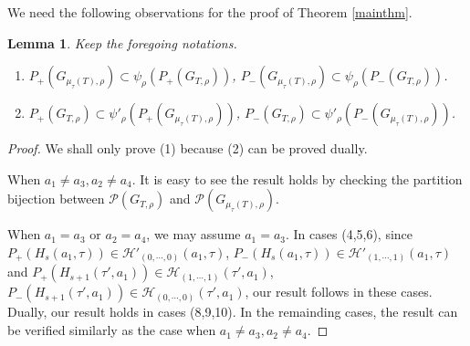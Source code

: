 \documentclass[10pt]{amsart}
\theoremstyle{theorems}
\newtheorem{Lemma}[Theorem]{Lemma}
\begin{document}
\medskip

We need the following observations for the proof of Theorem \ref{mainthm}.

\medskip

\begin{Lemma}\label{maxtomax}
Keep the foregoing notations.
\begin{enumerate}[$(1)$]

  \item $P_{+}(G_{\mu_{\tau}(T),\rho})\subset \psi_{\rho}(P_{+}(G_{T,\rho}))$,\;\;  $P_{-}(G_{\mu_{\tau}(T),\rho})\subset \psi_{\rho}(P_{-}(G_{T,\rho}))$.

  \item $P_{+}(G_{T,\rho})\subset \psi'_{\rho}(P_{+}(G_{\mu_{\tau}(T),\rho}))$,\;\;  $P_{-}(G_{T,\rho})\subset \psi'_{\rho}(P_{-}(G_{\mu_{\tau}(T),\rho}))$.

\end{enumerate}

\end{Lemma}

\begin{proof}

We shall only prove (1) because (2) can be proved dually.

When $a_1\neq a_3, a_2\neq a_4$. It is easy to see the result holds by checking the partition bijection between $\mathcal P(G_{T,\rho})$ and $\mathcal P(G_{\mu_{\tau}(T),\rho})$.

When $a_1=a_3$ or $a_2=a_4$, we may assume $a_1=a_3$. In cases (4,5,6), since $P_{+}(H_s(a_1,\tau))\in \mathcal H'_{(0,\cdots,0)}(a_1,\tau)$, $P_{-}(H_s(a_1,\tau))\in \mathcal H'_{(1,\cdots,1)}(a_1,\tau)$ and  $P_{+}(H_{s+1}(\tau',a_1))\in \mathcal H_{(1,\cdots,1)}(\tau',a_1)$, $P_{-}(H_{s+1}(\tau',a_1))\in \mathcal H_{(0,\cdots,0)}(\tau',a_1)$, our result follows in these cases. Dually, our result holds in cases (8,9,10).
In the remainding cases, the result can be verified similarly as the case when $a_1\neq a_3, a_2\neq a_4$.
\end{proof}

\medskip
\end{document}
